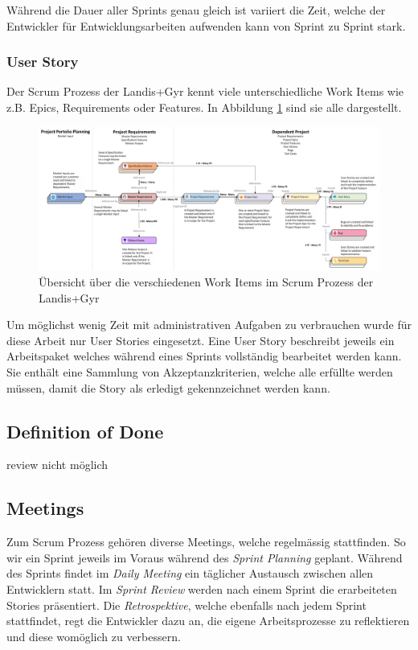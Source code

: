 Während die Dauer aller Sprints genau gleich ist variiert die Zeit, welche der Entwickler für Entwicklungsarbeiten aufwenden kann von Sprint zu Sprint stark.

\subsubsection{User Story}
Der Scrum Prozess der Landis+Gyr kennt viele unterschiedliche Work Items wie z.B. Epics, Requirements oder Features.
In Abbildung \ref{fig:workitems} sind sie alle dargestellt.
\begin{figure}[H]
   \centering
   \includegraphics[width=1.0\textwidth]{gfx/WorkItemRelationsship.png}
   \caption{
      Übersicht über die verschiedenen Work Items im Scrum Prozess der Landis+Gyr
      }
      \label{fig:workitems}
\end{figure}
Um möglichst wenig Zeit mit administrativen Aufgaben zu verbrauchen wurde für diese Arbeit nur User Stories eingesetzt.
Eine User Story beschreibt jeweils ein Arbeitspaket welches während eines Sprints vollständig bearbeitet werden kann.
Sie enthält eine Sammlung von Akzeptanzkriterien, welche alle erfüllte werden müssen, damit die Story als erledigt gekennzeichnet werden kann.


\subsection{Definition of Done}
review nicht möglich

\subsection{Meetings}
Zum Scrum Prozess gehören diverse Meetings, welche regelmässig stattfinden.
So wir ein Sprint jeweils im Voraus während des \textit{Sprint Planning} geplant.
Während des Sprints findet im \textit{Daily Meeting} ein täglicher Austausch zwischen allen Entwicklern statt.
Im \textit{Sprint Review} werden nach einem Sprint die erarbeiteten Stories präsentiert.
Die \textit{Retrospektive}, welche ebenfalls nach jedem Sprint stattfindet, regt die Entwickler dazu an, die eigene Arbeitsprozesse zu reflektieren und diese womöglich zu verbessern.

